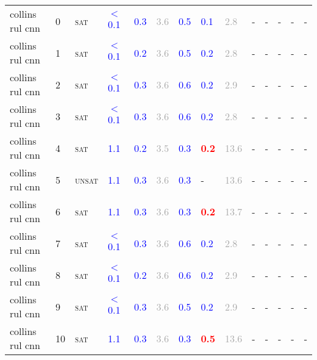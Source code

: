 \begin{center}
{\begin{longtable}{@{}llllllllllllll@{}}
collins rul cnn & 0 & \textsc{sat} & \textcolor{blue}{$<$0.1} & \textcolor{blue}{0.3} & \textcolor{darkgray}{3.6} & \textcolor{blue}{0.5} & \textcolor{blue}{0.1} & \textcolor{darkgray}{2.8} & - & - & - & - & - \\
collins rul cnn & 1 & \textsc{sat} & \textcolor{blue}{$<$0.1} & \textcolor{blue}{0.2} & \textcolor{darkgray}{3.6} & \textcolor{blue}{0.5} & \textcolor{blue}{0.2} & \textcolor{darkgray}{2.8} & - & - & - & - & - \\
collins rul cnn & 2 & \textsc{sat} & \textcolor{blue}{$<$0.1} & \textcolor{blue}{0.3} & \textcolor{darkgray}{3.6} & \textcolor{blue}{0.6} & \textcolor{blue}{0.2} & \textcolor{darkgray}{2.9} & - & - & - & - & - \\
collins rul cnn & 3 & \textsc{sat} & \textcolor{blue}{$<$0.1} & \textcolor{blue}{0.3} & \textcolor{darkgray}{3.6} & \textcolor{blue}{0.6} & \textcolor{blue}{0.2} & \textcolor{darkgray}{2.8} & - & - & - & - & - \\
collins rul cnn & 4 & \textsc{sat} & \textcolor{blue}{1.1} & \textcolor{blue}{0.2} & \textcolor{darkgray}{3.5} & \textcolor{blue}{0.3} & \textbf{\textcolor{red}{0.2}} & \textcolor{darkgray}{13.6} & - & - & - & - & - \\
collins rul cnn & 5 & \textsc{unsat} & \textcolor{blue}{1.1} & \textcolor{blue}{0.3} & \textcolor{darkgray}{3.6} & \textcolor{blue}{0.3} & - & \textcolor{darkgray}{13.6} & - & - & - & - & - \\
collins rul cnn & 6 & \textsc{sat} & \textcolor{blue}{1.1} & \textcolor{blue}{0.3} & \textcolor{darkgray}{3.6} & \textcolor{blue}{0.3} & \textbf{\textcolor{red}{0.2}} & \textcolor{darkgray}{13.7} & - & - & - & - & - \\
collins rul cnn & 7 & \textsc{sat} & \textcolor{blue}{$<$0.1} & \textcolor{blue}{0.3} & \textcolor{darkgray}{3.6} & \textcolor{blue}{0.6} & \textcolor{blue}{0.2} & \textcolor{darkgray}{2.8} & - & - & - & - & - \\
collins rul cnn & 8 & \textsc{sat} & \textcolor{blue}{$<$0.1} & \textcolor{blue}{0.2} & \textcolor{darkgray}{3.6} & \textcolor{blue}{0.6} & \textcolor{blue}{0.2} & \textcolor{darkgray}{2.9} & - & - & - & - & - \\
collins rul cnn & 9 & \textsc{sat} & \textcolor{blue}{$<$0.1} & \textcolor{blue}{0.3} & \textcolor{darkgray}{3.6} & \textcolor{blue}{0.5} & \textcolor{blue}{0.2} & \textcolor{darkgray}{2.9} & - & - & - & - & - \\
collins rul cnn & 10 & \textsc{sat} & \textcolor{blue}{1.1} & \textcolor{blue}{0.3} & \textcolor{darkgray}{3.6} & \textcolor{blue}{0.3} & \textbf{\textcolor{red}{0.5}} & \textcolor{darkgray}{13.6} & - & - & - & - & - \\

\end{longtable}}
\end{center}
